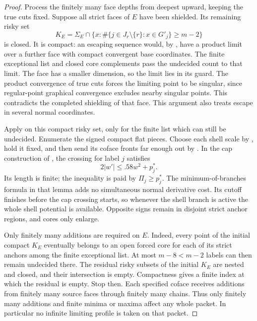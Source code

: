 \documentclass[11pt]{article}
\numberwithin{equation}{section}
\theoremstyle{definition}
\theoremstyle{remark}
\begin{document}
\begin{proof}
Process the finitely many face depths from deepest upward, keeping the
true cuts fixed. Suppose all strict faces of $E$ have been shielded.
Its remaining risky set
\[
 K_E=\Sigma_E\cap
 \{x:\#\{j\in J_r\setminus\{r\}:x\in G'_j\}\ge m-2\}
\]
is closed. It is compact: an escaping sequence would, by
, have a product limit over a further face with
compact convergent base coordinates. The finite exceptional list and
closed core complements pass the undecided count to that limit.
The face has a smaller dimension, so the limit lies in its guard.
The product convergence of true cuts forces the limiting point to be
singular, since regular-point graphical convergence excludes nearby
singular points. This contradicts the completed shielding of that
face. This argument also treats escape in several normal coordinates.

Apply  on this compact
risky set, only for the finite list which can still be undecided.
Enumerate the signed compact flat pieces. Choose each shell scale by
, hold it fixed, and then send its coface fronts
far enough out by . In the cap construction
of , the crossing for label $j$ satisfies
\[
 2|w'|\le .58w^2+p_j^*.
\]
Its length is finite; the inequality is paid by $\Pi_j\ge p_j^*$.
The minimum-of-branches formula in that lemma adds no simultaneous
normal derivative cost. Its cutoff finishes before the cap crossing
starts, so whenever the shell branch is active the whole shell
potential is available. Opposite signs remain in disjoint strict
anchor regions, and cores only enlarge.

Only finitely many additions are required on $E$. Indeed, every point
of the initial compact $K_E$ eventually belongs to an open forced core
for each of its strict anchors among the finite exceptional list.
At most $m-8<m-2$ labels can then remain undecided there. The residual
risky subsets of the initial $K_E$ are nested and closed, and their
intersection is empty. Compactness gives a finite index at which the
residual is empty. Stop then. Each specified coface receives additions
from finitely many source faces through finitely many chains. Thus
only finitely many additions and finite minima or maxima affect any
whole packet. In particular no infinite limiting profile is taken on
that packet.


\end{proof}
\end{document}
